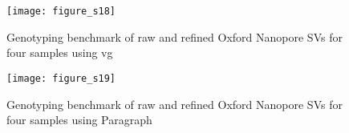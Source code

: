 \documentclass[12pt]{article}
\newenvironment{lsfigure}
	{\begin{landscape} \begin{figure} \centering}
	{\end{figure} \end{landscape}}
\begin{document}
\clearpage%

\begin{lsfigure}
	\texttt{[image: figure\_s18]}

	\caption{Genotyping benchmark of raw and refined Oxford Nanopore SVs for four samples using vg}

	\label{fig_s18}

\end{lsfigure}

\clearpage%

\begin{lsfigure}
	\texttt{[image: figure\_s19]}

	\caption{Genotyping benchmark of raw and refined Oxford Nanopore SVs for four samples using Paragraph}

	\label{fig_s19}

\end{lsfigure}

\clearpage%



\end{document}
